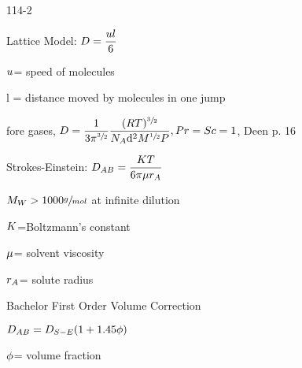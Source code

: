 \begin{mitframe}{114-2}
\begin{listone}	
    \item Lattice Model: $\elecdisplace=\dfrac{\forcepot{l}}{6}$
    	\begin{listtwo}
        	\item $\forcepot$= speed of molecules
            \item l = distance moved by molecules in one jump
            \item fore gases, $\elecdisplace=\dfrac{1}{3\pi^{\sfrac{3}{2}}}\dfrac{(\gasconst\Temp)^{\sfrac{3}{2}}}{\nummoles_{\helmholtz}\mathrm{d}^2{M}^{\sfrac{1}{2}}\p}, \prandtl=\schmidt=1$, Deen p. 16
        \end{listtwo}
 \item Strokes-Einstein: $\elecdisplace_{\helmholtz\exergy}=\dfrac{\dilfac\Temp}{6\pi\chempot\pos_{\helmholtz}}$
 		\begin{listtwo}
        	\item $\mw>1000\sfrac{g}{mol}$ at infinite dilution
            \item $\dilfac$=Boltzmann's constant
            \item $\chempot$= solvent viscosity
            \item $\pos_{\helmholtz}$= solute radius
            \item Bachelor First Order Volume Correction
            \begin{listthree}
            	\item $\elecdisplace_{\helmholtz\exergy}=\elecdisplace_{\entropy-\energy}(1+1.45\eleccoeff)$
                \item $\eleccoeff$= volume fraction
            \end{listthree}
        \end{listtwo}
 \end{listone} 
\end{mitframe}